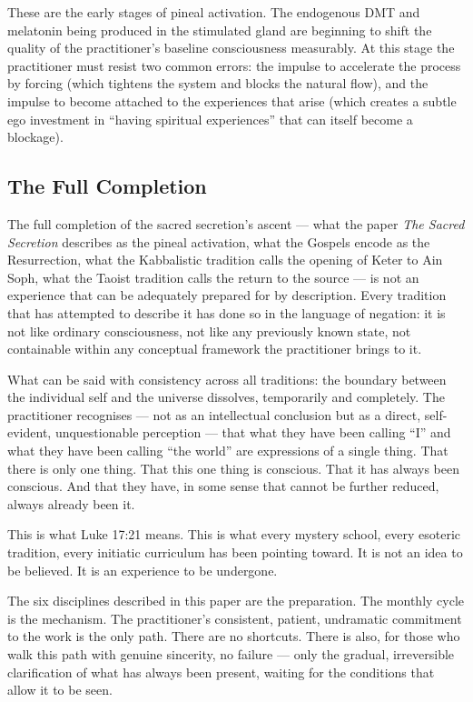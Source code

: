 \documentclass[12pt, a4paper]{article}
\begin{document}
These are the early stages of pineal activation. The endogenous DMT and
melatonin being produced in the stimulated gland are beginning to shift the
quality of the practitioner's baseline consciousness measurably. At this stage
the practitioner must resist two common errors: the impulse to accelerate the
process by forcing (which tightens the system and blocks the natural flow), and
the impulse to become attached to the experiences that arise (which creates a
subtle ego investment in ``having spiritual experiences'' that can itself
become a blockage).

\subsection{The Full Completion}

The full completion of the sacred secretion's ascent — what the paper
\emph{The Sacred Secretion} describes as the pineal activation, what the Gospels
encode as the Resurrection, what the Kabbalistic tradition calls the opening
of Keter to Ain Soph, what the Taoist tradition calls the return to the source
— is not an experience that can be adequately prepared for by description.
Every tradition that has attempted to describe it has done so in the language
of negation: it is not like ordinary consciousness, not like any previously
known state, not containable within any conceptual framework the practitioner
brings to it.

What can be said with consistency across all traditions: the boundary between
the individual self and the universe dissolves, temporarily and completely.
The practitioner recognises — not as an intellectual conclusion but as a
direct, self-evident, unquestionable perception — that what they have been
calling ``I'' and what they have been calling ``the world'' are expressions of
a single thing. That there is only one thing. That this one thing is conscious.
That it has always been conscious. And that they have, in some sense that
cannot be further reduced, always already been it.

This is what Luke 17:21 means. This is what every mystery school, every
esoteric tradition, every initiatic curriculum has been pointing toward. It is
not an idea to be believed. It is an experience to be undergone.

The six disciplines described in this paper are the preparation. The monthly
cycle is the mechanism. The practitioner's consistent, patient, undramatic
commitment to the work is the only path. There are no shortcuts. There is also,
for those who walk this path with genuine sincerity, no failure — only the
gradual, irreversible clarification of what has always been present, waiting
for the conditions that allow it to be seen.
\end{document}
